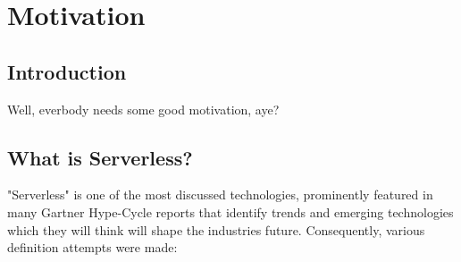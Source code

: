 \chapter{Motivation}\label{chp:motivation}


\section{Introduction}

Well, everbody needs some good motivation, aye?

\section{What is Serverless?}\label{sec:whatIsServerless}

"Serverless" is one of the most discussed technologies, prominently featured in many Gartner Hype-Cycle reports that identify trends and emerging technologies which they will think will shape the industries future. 
\autocite{Smith2017Hype2017}\highcomma
\autocite{Weiss2017Hype2017}\highcomma
\autocite{Natis2017Hype2017}\highcomma
\autocite{Walker2017Hype2017}\highcomma
\autocite{DawsonPhilip2017Hype2017}
Consequently, various definition attempts were made:


